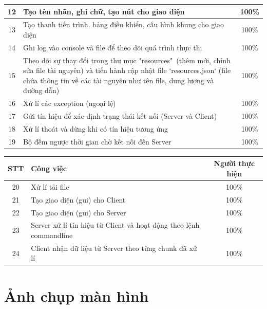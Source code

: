 \documentclass[a4paper,12pt]{report}
\begin{document}
\begin{center}
\begin{tabular}{|c|p{}|c|}
    12           & Tạo tên nhãn, ghi chữ, tạo nút cho giao diện                                                      & 100\%             \\\hline
    13           & Tạo thanh tiến trình, bảng điều khiển, cấu hình khung cho giao diện                           & 100\%             \\\hline
    14           & Ghi log vào console và file để theo dõi quá trình thực thi                & 100\%             \\\hline
    15           & Theo dõi sự thay đổi trong thư mục "resources"~(thêm mới, chỉnh sửa file tài nguyên) và tiến hành cập nhật file `resources.json` (file chứa thông tin về các tài nguyên như tên file, dung lượng và đường dẫn) & 100\%             \\\hline
    16           & Xử lí các exception (ngoại lệ)                & 100\%             \\\hline
    17           & Gửi tín hiệu để xác định trạng thái kết nối (Server và Client)         & 100\%             \\\hline
    18           & Xử lí thoát và dừng khi có tín hiệu tương ứng              & 100\%             \\\hline
    19           & Bộ đếm ngược thời gian chờ kết nối đến Server                & 100\%             \\\hline
    \end{tabular}
\pagebreak
\begin{tabular}{|c|p{}|c|}
    \hline
    \textbf{STT} & \textbf{Công việc} & \textbf{Người thực hiện} \\\hline
    20           & Xử lí tải file                 & 100\%             \\\hline
    21           & Tạo giao diện (gui) cho Client               & 100\%             \\\hline
    22           & Tạo giao diện (gui) cho Server               & 100\%             \\\hline
    23           & Server xử lí tín hiệu từ Client và hoạt động theo lệnh commandline               & 100\%             \\\hline
    24           & Client nhận dữ liệu từ Server theo từng chunk đã xử lí             & 100\%
    \\\hline
  \end{tabular}
\end{center}

\pagebreak
\section{Ảnh chụp màn hình}
\end{document}
